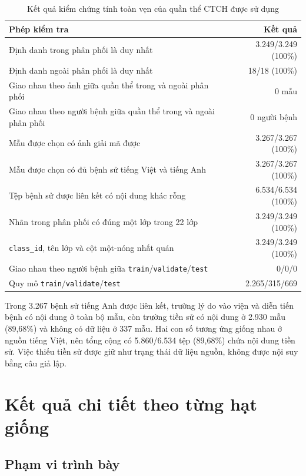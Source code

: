 \begin{table}[H]
\centering
\small
\begin{tabular}{|L{8.2cm}|r|}
\hline
\textbf{Phép kiểm tra} & \textbf{Kết quả} \\ \hline
Định danh trong phân phối là duy nhất & 3.249/3.249 (100\%) \\ \hline
Định danh ngoài phân phối là duy nhất & 18/18 (100\%) \\ \hline
Giao nhau theo ảnh giữa quần thể trong và ngoài phân phối & 0 mẫu \\ \hline
Giao nhau theo người bệnh giữa quần thể trong và ngoài phân phối & 0 người bệnh \\ \hline
Mẫu được chọn có ảnh giải mã được & 3.267/3.267 (100\%) \\ \hline
Mẫu được chọn có đủ bệnh sử tiếng Việt và tiếng Anh & 3.267/3.267 (100\%) \\ \hline
Tệp bệnh sử được liên kết có nội dung khác rỗng & 6.534/6.534 (100\%) \\ \hline
Nhãn trong phân phối có đúng một lớp trong 22 lớp & 3.249/3.249 (100\%) \\ \hline
\texttt{class\_id}, tên lớp và cột một-nóng nhất quán & 3.249/3.249 (100\%) \\ \hline
Giao nhau theo người bệnh giữa \texttt{train}/\texttt{validate}/\texttt{test} & 0/0/0 \\ \hline
Quy mô \texttt{train}/\texttt{validate}/\texttt{test} & 2.265/315/669 \\ \hline
\end{tabular}
\caption{Kết quả kiểm chứng tính toàn vẹn của quần thể CTCH được sử dụng}
\label{tab:appendix-ctch-integrity-verification}
\end{table}

Trong 3.267 bệnh sử tiếng Anh được liên kết, trường lý do vào viện và diễn tiến bệnh có nội dung ở toàn bộ mẫu, còn trường tiền sử có nội dung ở 2.930 mẫu (89,68\%) và không có dữ liệu ở 337 mẫu. Hai con số tương ứng giống nhau ở nguồn tiếng Việt, nên tổng cộng có 5.860/6.534 tệp (89,68\%) chứa nội dung tiền sử. Việc thiếu tiền sử được giữ như trạng thái dữ liệu nguồn, không được nội suy bằng câu giả lập.


\chapter{Kết quả chi tiết theo từng hạt giống}
\label{AppendixSeedResults}

\section{Phạm vi trình bày}

